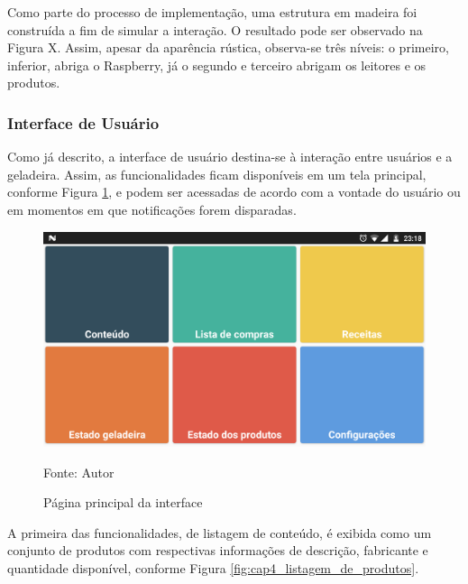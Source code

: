 
Como parte do processo de implementação, uma estrutura em madeira foi construída a fim de simular a interação. O resultado pode ser observado na Figura X. Assim, apesar da aparência rústica, observa-se três níveis: o primeiro, inferior, abriga o Raspberry, já o segundo e terceiro abrigam os leitores e os produtos.


\subsubsection{Interface de Usuário}

Como já descrito, a interface de usuário destina-se à interação entre usuários e a geladeira. Assim, as funcionalidades ficam disponíveis em um tela principal, conforme Figura \ref{fig:cap3_app_mainpage}, e podem ser acessadas de acordo com a vontade do usuário ou em momentos em que notificações forem disparadas.

\begin{figure}[htb]
    \caption{Página principal da interface}
    \label{fig:cap3_app_mainpage}
    \includegraphics[width=\textwidth]{figuras/cap4_app_mainpage.png}
    
    \footnotesize{Fonte: Autor}
\end{figure}

A primeira das funcionalidades, de listagem de conteúdo, é exibida como um conjunto de produtos com respectivas informações de descrição, fabricante e quantidade disponível, conforme Figura \ref{fig:cap4_listagem_de_produtos}.

